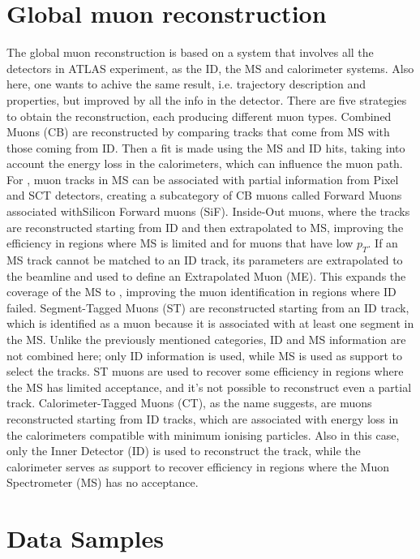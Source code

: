 \documentclass[11pt,a4paper,twoside,openright]{report}
\begin{document}
\section{Global muon reconstruction}
The global muon reconstruction is based on a system that involves all the detectors in ATLAS experiment, as the ID, the MS and calorimeter systems. Also here, one wants to achive the same result, i.e. trajectory description and properties, but improved by all the info in the detector. There are five strategies to obtain the reconstruction, each producing different muon types. Combined Muons (CB) are reconstructed by comparing tracks that come from MS with those coming from ID. Then a fit is made using the MS and ID hits, taking into account the energy loss in the calorimeters, which can influence the muon path. For , muon tracks in MS can be associated with partial information from Pixel and SCT detectors, creating a subcategory of CB muons called Forward Muons associated withSilicon Forward muons (SiF). Inside-Out muons, where the tracks are reconstructed starting from ID and then extrapolated to MS, improving the efficiency in regions where MS is limited and for muons that have low \( p_T \). If an MS track cannot be matched to an ID track, its parameters are extrapolated to the beamline and used to define an Extrapolated Muon (ME). This expands the coverage of the MS to , improving the muon identification in regions where ID failed. Segment-Tagged Muons (ST) are reconstructed starting from an ID track, which is identified as a muon because it is associated with at least one segment in the MS. Unlike the previously mentioned categories, ID and MS information are not combined here; only ID information is used, while MS is used as support to select the tracks. ST muons are used to recover some efficiency in regions where the MS has limited acceptance, and it's not possible to reconstruct even a partial track. Calorimeter-Tagged Muons (CT), as the name suggests, are muons reconstructed starting from ID tracks, which are associated with energy loss in the calorimeters compatible with minimum ionising particles. Also in this case, only the Inner Detector (ID) is used to reconstruct the track, while the calorimeter serves as support to recover efficiency in regions where the Muon Spectrometer (MS) has no acceptance.

\section{Data Samples}
\end{document}

